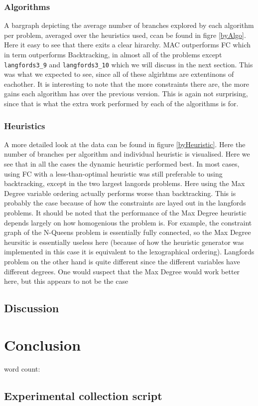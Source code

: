 \documentclass[british]{article}
\newcommand{\code}[1]{\texttt{#1}}
\begin{document}
\subsubsection{Algorithms}
A bargraph depicting the average number of branches explored by each algorithm per problem, averaged over the heuristics used, ccan be found in figre \ref{byAlgo}. Here it easy to see that there exits a clear hirarchy. MAC outperforms FC which in term outperforms Backtracking, in almost all of the problems except \code{langfords3\_9} and \code{langfords3\_10} which we will discuss in the next section. This was what we expected to see, since all of these algirhtms are extentinons of eachother. It is interesting to note that the more constraints there are, the more gains each algorithm has over the previous version. This is again not surprising, since that is what the extra work performed by each of the algorithms is for.


\subsubsection{Heuristics}
A more detailed look at the data can be found in figure \ref{byHeuristic}. Here the number of branches per algorithm and individual heuristic is visualised. Here we see that in all the cases the dynamic heuristic performed best. In most cases, using FC with a less-than-optimal heuristic was still preferable to using backtracking, except in the two largest langords problems. Here using the Max Degree variable ordering actually performs worse than backtracking. This is probably the case because of how the constraints are layed out in the langfords problems. It should be noted that the performance of the Max Degree heuristic depends largely on how homogenious the problem is. For example, the constraint graph of the N-Queens problem is essentially fully connected, so the Max Degree heursitic is essentially useless here (because of how the heuristic generator was implemented in this case it is equivalent to the lexographical ordering). Langfords problem on the other hand is quite different since the different variables have different degrees. {\color{red}One would suspect that the Max Degree would work better here, but this appears to not be the case }


\subsection{Discussion}


\section{Conclusion}
\label{conclusion}


word count: 
\printbibliography

 \begin{appendices}
 	\section{Experimental collection script}
 	\label{collection}
 	
 \end{appendices}
 
 
\end{document}
